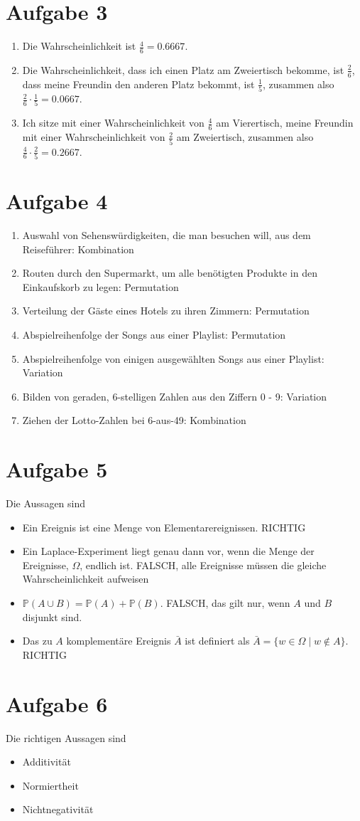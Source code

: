 \documentclass{article}
\begin{document}
	\section*{Aufgabe 3}
	\begin{enumerate}[label=(\alph*)]
		\item Die Wahrscheinlichkeit ist $\frac{4}{6}=0.6667$.
		\item Die Wahrscheinlichkeit, dass ich einen Platz am Zweiertisch bekomme, ist $\frac{2}{6}$, dass meine Freundin den anderen Platz bekommt, ist $\frac{1}{5}$, zusammen also $\frac{2}{6}\cdot\frac{1}{5}=0.0667$.
		\item Ich sitze mit einer Wahrscheinlichkeit von $\frac{4}{6}$ am Vierertisch, meine Freundin mit einer Wahrscheinlichkeit von $\frac{2}{5}$ am Zweiertisch, zusammen also $\frac{4}{6}\cdot\frac{2}{5}=0.2667$.
	\end{enumerate}

	\section*{Aufgabe 4}
	\begin{enumerate}[label=(\alph*)]
		\item Auswahl von Sehenswürdigkeiten, die man besuchen will, aus dem Reiseführer: Kombination
		\item Routen durch den Supermarkt, um alle benötigten Produkte in den Einkaufskorb zu legen: Permutation
		\item Verteilung der Gäste eines Hotels zu ihren Zimmern: Permutation
		\item Abspielreihenfolge der Songs aus einer Playlist: Permutation
		\item Abspielreihenfolge von einigen ausgewählten Songs aus einer Playlist: Variation
		\item Bilden von geraden, 6-stelligen Zahlen aus den Ziffern 0 - 9: Variation
		\item Ziehen der Lotto-Zahlen bei 6-aus-49: Kombination
	\end{enumerate}

	\section*{Aufgabe 5}
	Die Aussagen sind
	\begin{itemize}
		\item Ein Ereignis ist eine Menge von Elementarereignissen. RICHTIG
		\item Ein Laplace-Experiment liegt genau dann vor, wenn die Menge der Ereignisse, $\Omega$, endlich ist. FALSCH, alle Ereignisse müssen die gleiche Wahrscheinlichkeit aufweisen
		\item $\mathbb{P}(A\cup B) = \mathbb{P}(A) + \mathbb{P}(B)$. FALSCH, das gilt nur, wenn $A$ und $B$ disjunkt sind.
		\item Das zu $A$ komplementäre Ereignis $\bar{A}$ ist definiert als $\bar{A}=\{w\in\Omega\mid w\notin A\}$. RICHTIG
	\end{itemize}

	\section*{Aufgabe 6}
	Die richtigen Aussagen sind
	\begin{itemize}
		\item Additivität
		\item Normiertheit
		\item Nichtnegativität
	\end{itemize}
	
\end{document}
